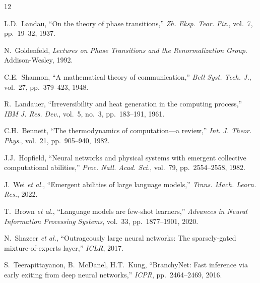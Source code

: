\documentclass[10pt,twocolumn]{article}
\begin{document}
\begin{thebibliography}{12}

L.D.~Landau, 
``On the theory of phase transitions,'' 
\textit{Zh. Eksp. Teor. Fiz.}, 
vol.~7, pp.~19--32, 1937.

N.~Goldenfeld, 
\textit{Lectures on Phase Transitions and the 
Renormalization Group}. 
Addison-Wesley, 1992.

C.E.~Shannon, 
``A mathematical theory of communication,'' 
\textit{Bell Syst. Tech. J.}, 
vol.~27, pp.~379--423, 1948.

R.~Landauer, 
``Irreversibility and heat generation in the computing 
process,'' 
\textit{IBM J. Res. Dev.}, 
vol.~5, no.~3, pp.~183--191, 1961.

C.H.~Bennett, 
``The thermodynamics of computation---a review,'' 
\textit{Int. J. Theor. Phys.}, 
vol.~21, pp.~905--940, 1982.

J.J.~Hopfield, 
``Neural networks and physical systems with emergent 
collective computational abilities,'' 
\textit{Proc. Natl. Acad. Sci.}, 
vol.~79, pp.~2554--2558, 1982.

J.~Wei \textit{et al.}, 
``Emergent abilities of large language models,'' 
\textit{Trans. Mach. Learn. Res.}, 2022.

T.~Brown \textit{et al.}, 
``Language models are few-shot learners,'' 
\textit{Advances in Neural Information Processing Systems}, 
vol.~33, pp.~1877--1901, 2020.

N.~Shazeer \textit{et al.}, 
``Outrageously large neural networks: The 
sparsely-gated mixture-of-experts layer,'' 
\textit{ICLR}, 2017.

S.~Teerapittayanon, B.~McDanel, H.T.~Kung, 
``BranchyNet: Fast inference via early exiting from 
deep neural networks,'' 
\textit{ICPR}, pp.~2464--2469, 2016.

\end{thebibliography}
\end{document}
